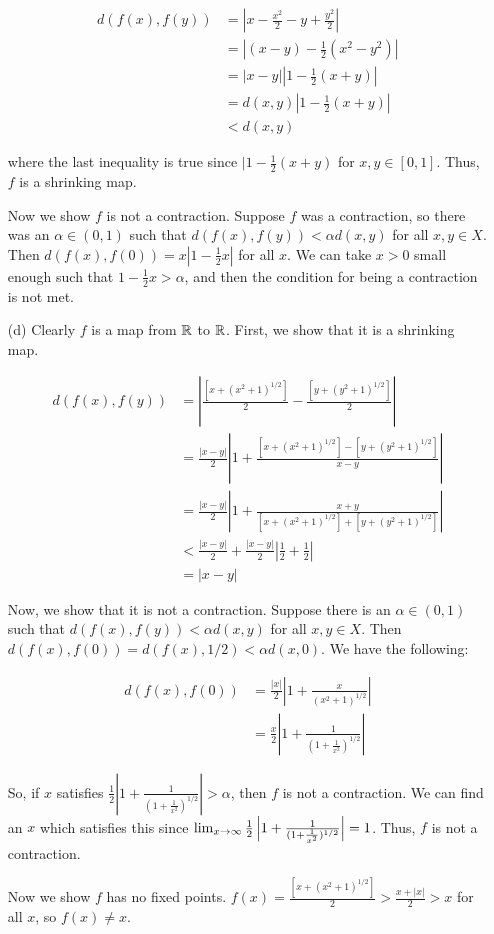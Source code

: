 \documentclass{hmwk}
\begin{document}
\begin{solution}
\begin{itemize}
    \begin{align*}
        d(f(x), f(y)) &= |x - \frac{x^2}{2} - y + \frac{y^2}{2}| \\
        &= |(x - y) - \frac{1}{2}(x^2 - y^2)| \\
        &= |x-y||1 - \frac{1}{2}(x + y)| \\
        &= d(x, y)|1 - \frac{1}{2}(x + y)| \\
        &< d(x, y)
    \end{align*}

    where the last inequality is true since $|1 - \frac{1}{2}(x + y)$ for $x, y \in [0, 1]$. Thus, $f$ is a shrinking map.

    \pre Now we show $f$ is not a contraction. Suppose $f$ was a contraction, so there was an $\alpha \in (0, 1)$ such that $d(f(x), f(y)) < \alpha d(x, y)$ for all $x, y \in X$. Then $d(f(x), f(0)) = x|1 - \frac{1}{2}x|$ for all $x$. We can take $x > 0$ small enough such that $1 - \frac{1}{2}x > \alpha$, and then the condition for being a contraction is not met. 

    \item[(d)] Clearly $f$ is a map from $\mathbb{R}$ to $\mathbb{R}$. First, we show that it is a shrinking map. 

    \begin{align*}
        d(f(x), f(y)) &= \left|\frac{[x + (x^2 + 1)^{1/2}]}{2} - \frac{[y + (y^2 + 1)^{1/2}]}{2}\right| \\
        &= \frac{|x - y|}{2}\left|1 + \frac{[x + (x^2 + 1)^{1/2}] - [y + (y^2 + 1)^{1/2}]}{x-y}\right| \\
        &= \frac{|x - y|}{2}\left|1 + \frac{x+y}{[x + (x^2 + 1)^{1/2}] + [y + (y^2 + 1)^{1/2}]}\right| \\
        &< \frac{|x - y|}{2} + \frac{|x - y|}{2}\left|\frac{1}{2} + \frac{1}{2}\right| \\
        &= |x-y|
    \end{align*}

    Now, we show that it is not a contraction. Suppose there is an $\alpha \in (0, 1)$ such that $d(f(x), f(y)) < \alpha d(x, y)$ for all $x, y \in X$. Then $d(f(x), f(0)) = d(f(x), 1/2) < \alpha d(x, 0)$. We have the following:

    \begin{align*}
        d(f(x), f(0)) &= \frac{|x|}{2}\left|1 + \frac{x}{(x^2 + 1)^{1/2}}\right| \\
        &= \frac{x}{2}\left|1 + \frac{1}{(1 + \frac{1}{x^2})^{1/2}}\right|
    \end{align*}

    So, if $x$ satisfies $\frac{1}{2}\left|1 + \frac{1}{(1 + \frac{1}{x^2})^{1/2}}\right| > \alpha$, then $f$ is not a contraction. We can find an $x$ which satisfies this since $\lim_{x \rightarrow \infty} \frac{1}{2}\left|1 + \frac{1}{(1 + \frac{1}{x^2})^{1/2}}\right| = 1$. Thus, $f$ is not a contraction. 

    \pre Now we show $f$ has no fixed points. $f(x) = \frac{[x + (x^2 + 1)^{1/2}]}{2} > \frac{x + |x|}{2} > x$ for all $x$, so $f(x) \neq x$.
\end{itemize}    
\end{solution}
\end{document}
